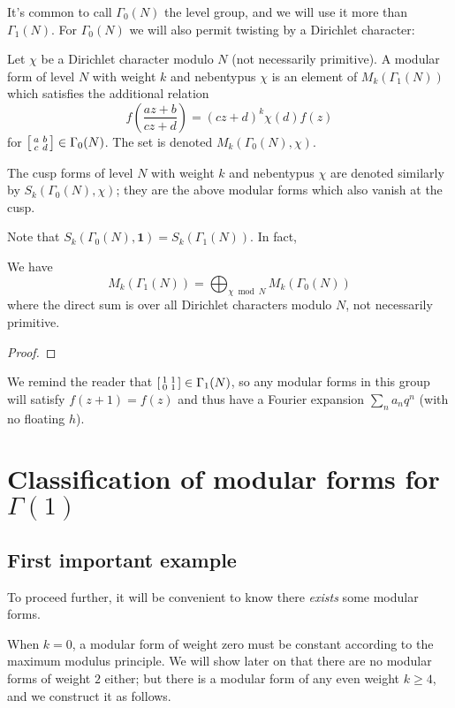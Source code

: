It's common to call $\Gamma_0(N)$ the \alert{level group},
and we will use it more than $\Gamma_1(N)$.
For $\Gamma_0(N)$ we will also permit twisting by a Dirichlet character:
\begin{definition}
  Let $\chi$ be a Dirichlet character modulo $N$ (not necessarily primitive).
  A \alert{modular form of level $N$ with weight $k$ and nebentypus $\chi$}
  is an element of $M_k(\Gamma_1(N))$ which satisfies the additional relation
  \[ f\left( \frac{az+b}{cz+d} \right)
    = (cz+d)^k \chi(d) f(z)  \]
  for $\begin{bsmallmatrix} a & b \\ c & d \end{bsmallmatrix} \in \Gamma_0(N)$.
  The set is denoted $M_k(\Gamma_0(N), \chi)$.

  The cusp forms of level $N$ with weight $k$ and nebentypus $\chi$
  are denoted similarly by $S_k(\Gamma_0(N), \chi)$;
  they are the above modular forms which also vanish at the cusp.
\end{definition}
Note that $S_k(\Gamma_0(N), \mathbf 1) = S_k(\Gamma_1(N))$.
In fact,
\begin{theorem}
  We have \[ M_k(\Gamma_1(N)) = \bigoplus_{\chi \bmod N} M_k(\Gamma_0(N)) \]
  where the direct sum is over all Dirichlet characters modulo $N$,
  not necessarily primitive.
\end{theorem}
\begin{proof}
\end{proof}

We remind the reader that $\begin{bsmallmatrix} 1 & 1 \\ 0 & 1 \end{bsmallmatrix} \in \Gamma_1(N)$,
so any modular forms in this group will satisfy $f(z+1)=f(z)$
and thus have a Fourier expansion $\sum_n a_n q^n$ (with no floating $h$).

\section{Classification of modular forms for $\Gamma(1)$}
\subsection{First important example}
To proceed further, it will be convenient to know
there \emph{exists} some modular forms.

When $k=0$, a modular form of weight zero must be constant
according to the maximum modulus principle.
We will show later on that there are no modular forms of weight $2$ either;
but there is a modular form of any even weight $k \ge 4$,
and we construct it as follows.

